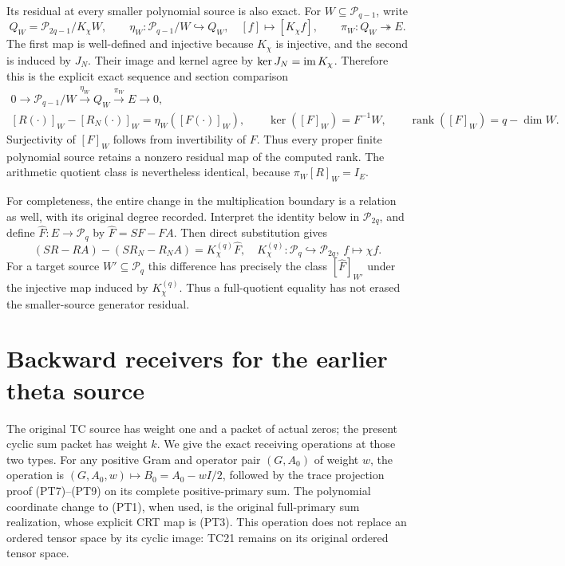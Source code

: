 \documentclass[11pt,a4paper]{article}
\providecommand{\rank}{\operatorname{rank}}
\providecommand{\PP}{\mathcal P}
\begin{document}
Its residual at every smaller polynomial source is also exact.
For \(W\subseteq\PP_{q-1}\), write
\[
 Q_W=\PP_{2q-1}/K_\chi W,\qquad
 \eta_W:\PP_{q-1}/W\hookrightarrow Q_W,\quad
 [f]\mapsto[K_\chi f],\qquad
 \pi_W:Q_W\twoheadrightarrow E.
\]
The first map is well-defined and injective because \(K_\chi\)
is injective, and the second is induced by \(J_N\).
Their image and kernel agree by \(\ker J_N=\operatorname{im} K_\chi\).
Therefore this is the explicit exact sequence and section comparison
\begin{equation}\tag{PT30}
 \begin{gathered}
 0\longrightarrow\PP_{q-1}/W\xrightarrow{\eta_W}Q_W
   \xrightarrow{\pi_W}E\longrightarrow0,\\
 [R(\cdot)]_W-[R_N(\cdot)]_W=\eta_W([F(\cdot)]_W),\qquad
 \ker([F]_W)=F^{-1}W,\qquad
 \rank([F]_W)=q-\dim W.
 \end{gathered}
\end{equation}
Surjectivity of \([F]_W\) follows from invertibility of \(F\).
Thus every proper finite polynomial source retains a nonzero
residual map of the computed rank. The arithmetic quotient class
is nevertheless identical, because \(\pi_W[R]_W=I_E\).

For completeness, the entire change in the multiplication boundary
is a relation as well, with its original degree recorded. Interpret
the identity below in \(\PP_{2q}\), and define
\(\widehat F:E\to\PP_q\) by \(\widehat F=SF-FA\).
Then direct substitution gives
\begin{equation}\tag{PT31}
 (SR-RA)-(SR_N-R_NA)=K_\chi^{(q)}\widehat F,
 \quad K_\chi^{(q)}:\PP_q\hookrightarrow\PP_{2q},\ f\mapsto\chi f.
\end{equation}
For a target source \(W'\subseteq\PP_q\) this difference has
precisely the class \([\widehat F]_{W'}\) under the injective
map induced by \(K_\chi^{(q)}\). Thus a full-quotient equality
has not erased the smaller-source generator residual.

\section{Backward receivers for the earlier theta source}

The original TC source has weight one and a packet of actual zeros;
the present cyclic sum packet has weight \(k\). We give the exact
receiving operations at those two types. For any positive Gram and
operator pair \((G,A_0)\) of weight \(w\), the operation is
\((G,A_0,w)\mapsto B_0=A_0-wI/2\), followed by the trace
projection proof (PT7)--(PT9) on its complete positive-primary sum.
The polynomial coordinate change to (PT1), when used, is the
original full-primary sum realization, whose explicit CRT map is
(PT3). This operation does not replace an ordered tensor space by
its cyclic image: TC21 remains on its original ordered tensor space.
\end{document}
